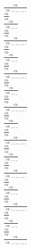\documentclass[11pt]{article}
\begin{document}
\begin{center}
\bigskip
\\$\frac{\Rightarrow }{\Rightarrow , , , , , , , }$
\bigskip
\\$\frac{\Rightarrow }{\Rightarrow }$
\bigskip
\\$\frac{\Rightarrow }{\Rightarrow , , , }$
\bigskip
\\$\frac{\Rightarrow }{\Rightarrow }$
\bigskip
\\$\frac{\Rightarrow }{\Rightarrow , , , , , , , }$
\bigskip
\\$\frac{\Rightarrow }{\Rightarrow }$
\bigskip
\\$\frac{\Rightarrow }{\Rightarrow , , , }$
\bigskip
\\$\frac{\Rightarrow }{\Rightarrow }$
\bigskip
\\$\frac{\Rightarrow }{\Rightarrow , , , , , , , }$
\bigskip
\\$\frac{\Rightarrow }{\Rightarrow }$
\bigskip
\\$\frac{\Rightarrow }{\Rightarrow , , , }$
\bigskip
\\$\frac{\Rightarrow }{\Rightarrow }$
\bigskip
\\$\frac{\Rightarrow }{\Rightarrow , , , , , , , }$
\bigskip
\\$\frac{\Rightarrow }{\Rightarrow }$
\bigskip
\\$\frac{\Rightarrow }{\Rightarrow , , , }$
\bigskip
\\$\frac{\Rightarrow }{\Rightarrow }$
\bigskip
\\$\frac{\Rightarrow }{\Rightarrow , , , , , , , }$
\bigskip
\\$\frac{\Rightarrow }{\Rightarrow }$
\bigskip
\\$\frac{\Rightarrow }{\Rightarrow , , , }$
\bigskip
\\$\frac{\Rightarrow }{\Rightarrow }$
\bigskip
\\$\frac{\Rightarrow }{\Rightarrow , , , , , , , }$
\bigskip
\\$\frac{\Rightarrow }{\Rightarrow }$
\bigskip
\\$\frac{\Rightarrow }{\Rightarrow , , , }$
\bigskip
\\$\frac{\Rightarrow }{\Rightarrow }$
\bigskip
\\$\frac{\Rightarrow }{\Rightarrow , , , , , , , }$
\bigskip
\\$\frac{\Rightarrow }{\Rightarrow }$
\bigskip
\\$\frac{\Rightarrow }{\Rightarrow , , , }$
\bigskip
\\$\frac{\Rightarrow }{\Rightarrow }$
\bigskip
\\$\frac{\Rightarrow }{\Rightarrow , , , , , , , }$

\end{center}
\end{document}
